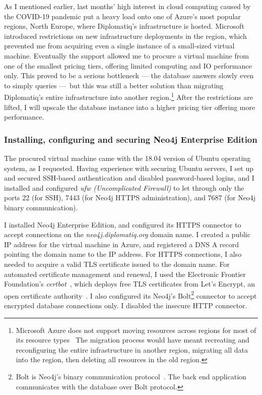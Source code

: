 As I mentioned earlier, last months' high interest in cloud computing caused by the COVID-19 pandemic put a heavy load onto one of Azure's most popular regions, North Europe, where Diplomatiq's infrastructure is hosted. Microsoft introduced restrictions on new infrastructure deployments in the region, which prevented me from acquiring even a single instance of a small-sized virtual machine. Eventually the support allowed me to procure a virtual machine from one of the smallest pricing tiers, offering limited computing and IO performance only. This proved to be a serious bottleneck — the database answers slowly even to simply queries — but this was still a better solution than migrating Diplomatiq's entire infrastructure into another region.\footnote{Microsoft Azure does not support moving resources across regions for most of its resource types~\cite{azure-migration} The migration process would have meant recreating and reconfiguring the entire infrastructure in another region, migrating all data into the region, then deleting all resources in the old region.} After the restrictions are lifted, I will upscale the database instance into a higher pricing tier offering more performance.

\subsubsection{Installing, configuring and securing Neo4j Enterprise Edition}

The procured virtual machine came with the 18.04 version of Ubuntu operating system, as I requested. Having experience with securing Ubuntu servers, I set up and secured SSH-based authentication and disabled password-based logins, and I installed and configured \emph{ufw (Uncomplicated Firewall)} to let through only the ports 22 (for SSH), 7443 (for Neo4j HTTPS administration), and 7687 (for Neo4j binary communication).

I installed Neo4j Enterprise Edition, and configured its HTTPS connector to accept connections on the \emph{neo4j.diplomatiq.org} domain name. I created a public IP address for the virtual machine in Azure, and registered a DNS A record pointing the domain name to the IP address. For HTTPS connections, I also needed to acquire a valid TLS certificate issued to the domain name. For automated certificate management and renewal, I used the Electronic Frontier Foundation's \emph{certbot}~\cite{certbot}, which deploys free TLS certificates from Let's Encrypt, an open certificate authority~\cite{letsencrypt}. I also configured its Neo4j's Bolt\footnote{Bolt is Neo4j's binary communication protocol~\cite{boltprotocol}. The back end application communicates with the database over Bolt protocol.} connector to accept encrypted database connections only. I disabled the insecure HTTP connector.

